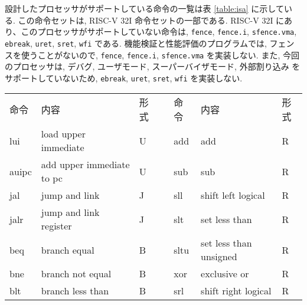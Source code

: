 \documentclass[../specifications.tex]{subfiles}
\begin{document}
  設計したプロセッサがサポートしている命令の一覧は表 \ref{table:isa} に示している.
  この命令セットは, RISC-V 32I 命令セットの一部である.
  RISC-V 32I にあり、このプロセッサがサポートしていない命令は, 
  \verb|fence|, \verb|fence.i|, \verb|sfence.vma|, \verb|ebreak|, 
  \verb|uret|, \verb|sret|, \verb|wfi| である.
  機能検証と性能評価のプログラムでは, フェンスを使うことがないので, 
  \verb|fence|, \verb|fence.i|, \verb|sfence.vma| を実装しない.
  また, 今回のプロセッサは, デバグ, ユーザモード, スーパーバイザモード, 外部割り込み
  をサポートしていないため, \verb|ebreak|, \verb|uret|, 
  \verb|sret|, \verb|wfi| を実装しない.

  \begin{table*}[t]
    \begin{tabular}{|l|l|l|llll}
    \cline{1-3} \cline{5-7}
    命令    & 内容                                    & 形式 & \multicolumn{1}{l|}{} & \multicolumn{1}{l|}{命令}     & \multicolumn{1}{l|}{内容}                            & \multicolumn{1}{l|}{形式} \\ \cline{1-3} \cline{5-7}
    lui   & load upper immediate                  & U  & \multicolumn{1}{l|}{} & \multicolumn{1}{l|}{add}    & \multicolumn{1}{l|}{add}                           & \multicolumn{1}{l|}{R}  \\
    auipc & add upper immediate to pc             & U  & \multicolumn{1}{l|}{} & \multicolumn{1}{l|}{sub}    & \multicolumn{1}{l|}{sub}                           & \multicolumn{1}{l|}{R}  \\
    jal   & jump and link                         & J  & \multicolumn{1}{l|}{} & \multicolumn{1}{l|}{sll}    & \multicolumn{1}{l|}{shift left logical}            & \multicolumn{1}{l|}{R}  \\
    jalr  & jump and link register                & J  & \multicolumn{1}{l|}{} & \multicolumn{1}{l|}{slt}    & \multicolumn{1}{l|}{set less than}                 & \multicolumn{1}{l|}{R}  \\
    beq   & branch equal                          & B  & \multicolumn{1}{l|}{} & \multicolumn{1}{l|}{sltu}   & \multicolumn{1}{l|}{set less than unsigned}        & \multicolumn{1}{l|}{R}  \\
    bne   & branch not equal                      & B  & \multicolumn{1}{l|}{} & \multicolumn{1}{l|}{xor}    & \multicolumn{1}{l|}{exclusive or}                  & \multicolumn{1}{l|}{R}  \\
    blt   & branch less than                      & B  & \multicolumn{1}{l|}{} & \multicolumn{1}{l|}{srl}    & \multicolumn{1}{l|}{shift right logical}           & \multicolumn{1}{l|}{R}  \\

\end{tabular}
\end{table*}
\end{document}
